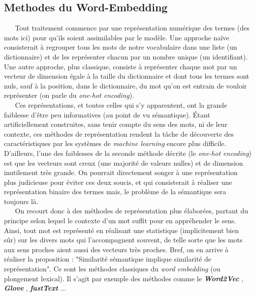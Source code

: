 \subsection{Methodes du Word-Embedding}
$ _{} $ $ _{} $ $ _{} $ $ _{} $ $ _{} $Tout traitement commence par une représentation numérique des termes (des mots ici) pour qu'ils soient assimilables par le modèle. Une approche naïve consisterait à regrouper tous les mots de notre vocabulaire dans une liste (un dictionnaire) et de les représenter chacun par un nombre unique (un identifiant). Une autre approche, plus classique, consiste à représenter chaque mot par un vecteur de dimension égale à la taille du dictionnaire et dont tous les termes sont nuls, sauf à la position, dans le dictionnaire, du mot qu'on est entrain de vouloir représenter (on parle du \textit{one-hot encoding}).\\
$ _{} $ $ _{} $ $ _{} $ $ _{} $ $ _{} $Ces représentations, et toutes celles qui s'y apparentent, ont la grande faiblesse d'être peu  informatives (au point de vu sémantique). Étant artificiellement construites, sans tenir compte du sens des mots, ni de leur contexte, ces méthodes de représentation rendent la tâche de découverte des caractéristiques par les systèmes de \textit{machine learning} encore plus difficile. D'ailleurs, l'une des faiblesses de la seconde méthode décrite (le \textit{one-hot encoding}) est que les vecteurs sont creux (une majorité de valeurs nulles) et de dimension inutilement très grande. On pourrait directement songer à une représentation plus ju\-di\-cieu\-se pour éviter ces deux soucis, et qui consisterait à réaliser une représentation binaire des termes mais, le problème de la sémantique sera toujours là.\\
$ _{} $ $ _{} $ $ _{} $ $ _{} $ $ _{} $On recourt donc à des méthodes de représentation plus élaborées, partant du principe selon lequel le contexte d'un mot suffit pour en appréhender le sens. Ainsi, tout mot est représenté en réalisant une statistique (implicitement bien sûr) sur les divers mots qui l'accompagnent souvent, de telle sorte que les mots aux sens proches aient aussi des vecteurs très proches. Bref, on en arrive à réaliser la proposition : "Similarité sémantique implique similarité de représentation". Ce sont les méthodes classiques du \textit{word embedding} (ou plongement lexical). Il s'agit par exemple des méthodes comme le \textit{\textbf{Word2Vec}} \cite{WORD2VECmikolov2013efficient, WORD2VEC2mikolov2013distributed}, \textit{\textbf{Glove}} \cite{GLOVEpennington2014glove}, \textit{\textbf{fastText}} \cite{FASTtEXTbojanowski2017enriching}...\\

